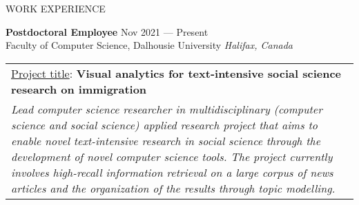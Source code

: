 \documentclass{resume} %
\begin{document}
\begin{rSection}{WORK EXPERIENCE}
\item \textbf{\large Postdoctoral Employee} \hfill Nov 2021 --- Present\\\smallskip
Faculty of Computer Science, Dalhousie University \hfill \textit{Halifax, Canada}\\
\begin{table}[!ht]
\vspace{-0.7cm}
    \begin{tabular}{|p{\textwidth}}
\underline{Project title}: \textbf{Visual analytics for text-intensive social science research on immigration}\\
\textit{Lead computer science researcher in multidisciplinary (computer science and social science) applied research project that aims to enable novel text-intensive research in social science through the development of novel computer science tools. The project currently involves high-recall information retrieval on a large corpus of news articles and the organization of the results through topic modelling. }
    \end{tabular}\vspace{-0.7cm}
\end{table}





\end{rSection}
\end{document}
